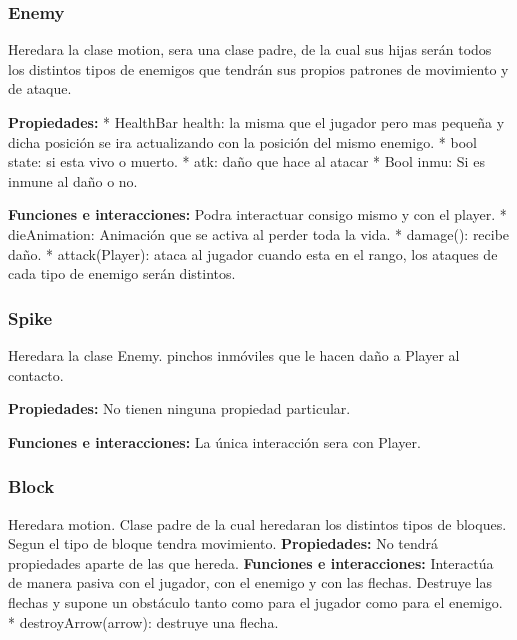 \documentclass{article}
\begin{document}
\subsubsection*{Enemy}
Heredara la clase motion, sera una clase padre, de la cual sus hijas serán todos los distintos tipos de enemigos que tendrán sus propios patrones de movimiento y de ataque.\newline

\subitem \textbf{Propiedades:} \newline
* HealthBar health: la misma que el jugador pero mas pequeña y dicha posición se ira actualizando con la posición del mismo enemigo.\newline
* bool state: si esta vivo o muerto.\newline
* atk: daño que hace al atacar\newline
* Bool inmu: Si es inmune al daño o no.\newline

\subitem \textbf{Funciones e interacciones:} \newline
Podra interactuar consigo mismo y con el player.\newline
* dieAnimation: Animación que se activa al perder toda la vida.\newline
* damage(): recibe daño.\newline
* attack(Player): ataca al jugador cuando esta en el rango, los ataques de cada tipo de enemigo serán distintos.\newline

\subsubsection*{Spike}
Heredara la clase Enemy. pinchos inmóviles que le hacen daño a Player al contacto.\newline

\subitem \textbf{Propiedades:} \newline
No tienen ninguna propiedad particular.

\subitem \textbf{Funciones e interacciones:} \newline
La única interacción sera con Player. \newline

\subsubsection*{Block}
Heredara motion. Clase padre de la cual heredaran los distintos tipos de bloques. Segun el tipo de bloque tendra movimiento.\newline
\subitem \textbf{Propiedades:} \newline
No tendrá propiedades aparte de las que hereda. \newline
\subitem \textbf{Funciones e interacciones:} \newline
Interactúa de manera pasiva con el jugador, con el enemigo y con las flechas. Destruye las flechas y supone un obstáculo tanto como para el jugador como para el enemigo. \newline
* destroyArrow(arrow): destruye una flecha.
\end{document}
